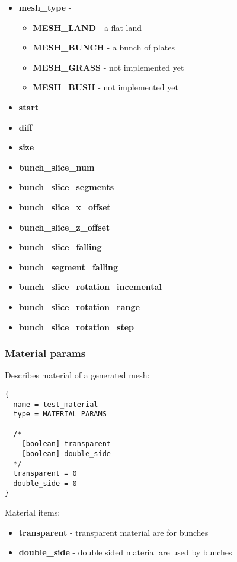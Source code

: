 \documentclass[9pt]{article}
\begin{document}
\begin{itemize}
\item{\bf mesh\_type} - 
\begin{itemize}
\item{\bf MESH\_LAND} - a flat land
\item{\bf MESH\_BUNCH} - a bunch of plates
\item{\bf MESH\_GRASS} - not implemented yet
\item{\bf MESH\_BUSH} - not implemented yet
\end{itemize}
\item{\bf start}
\item{\bf diff}
\item{\bf size}
\item{\bf bunch\_slice\_num}
\item{\bf bunch\_slice\_segments}
\item{\bf bunch\_slice\_x\_offset}
\item{\bf bunch\_slice\_z\_offset}
\item{\bf bunch\_slice\_falling}
\item{\bf bunch\_segment\_falling}
\item{\bf bunch\_slice\_rotation\_incemental}
\item{\bf bunch\_slice\_rotation\_range}
\item{\bf bunch\_slice\_rotation\_step}
\end{itemize}

\subsubsection{Material params}
Describes material of a generated mesh:
\begin{verbatim}
{
  name = test_material
  type = MATERIAL_PARAMS
  
  /*
    [boolean] transparent
    [boolean] double_side
  */
  transparent = 0
  double_side = 0  
}
\end{verbatim}
Material items:
\begin{itemize}
\item{\bf transparent} - transparent material are for bunches
\item{\bf double\_side} - double sided material are used by bunches
\end{itemize}
\end{document}
